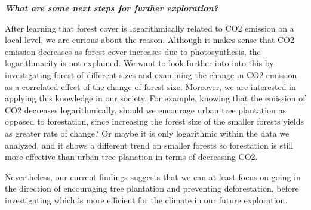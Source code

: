 \documentclass[12pt]{article}
\begin{document}
\begin{enumerate}
\begin{text}
\emph{\textbf{What are some next steps for further exploration?}}

After learning that forest cover is logarithmically related to CO2 emission on a local level, we are curious about the reason. Although it makes sense that CO2 emission decreases as forest cover increases due to photosynthesis, the logarithmacity is not explained. We want to look further into into this by investigating forest of different sizes and examining the change in CO2 emission as a correlated effect of the change of forest size. Moreover, we are interested in applying this knowledge in our society. For example, knowing that the emission of CO2 decreases logarithmically, should we encourage urban tree plantation as opposed to forestation, since increasing the forest size of the smaller forests yields as greater rate of change? Or maybe it is only logarithmic within the data we analyzed, and it shows a different trend on smaller forests so forestation is still more effective than urban tree planation in terms of decreasing CO2.

Nevertheless, our current findings suggests that we can at least focus on going in the direction of encouraging tree plantation and preventing deforestation, before investigating which is more efficient for the climate in our future exploration.

\end{text}


\maketitle

\newpage




\end{enumerate}
\end{document}
